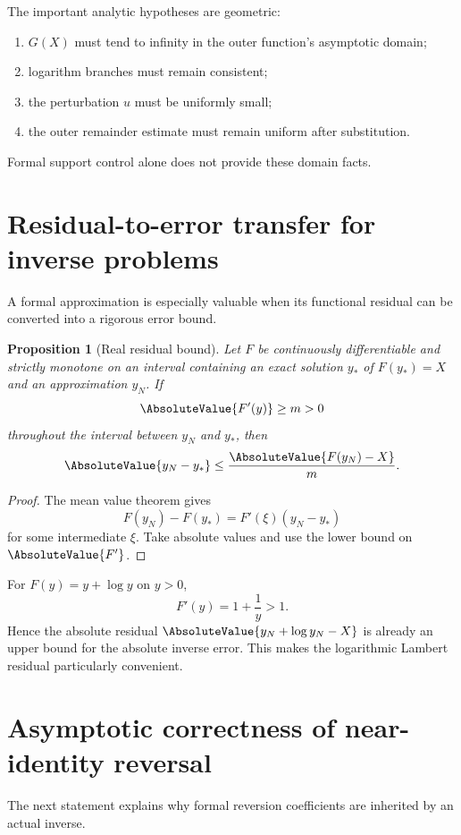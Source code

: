 \documentclass[11pt,openany]{book}
\theoremstyle{definition}
\theoremstyle{plain}
\newtheorem{proposition}{Proposition}[chapter]
\theoremstyle{remark}
\begin{document}
The important analytic hypotheses are geometric:
\begin{enumerate}
\item \(G(X)\) must tend to infinity in the outer function's asymptotic
      domain;
\item logarithm branches must remain consistent;
\item the perturbation \(u\) must be uniformly small;
\item the outer remainder estimate must remain uniform after substitution.
\end{enumerate}
Formal support control alone does not provide these domain facts.

\section{Residual-to-error transfer for inverse problems}
A formal approximation is especially valuable when its functional residual can
be converted into a rigorous error bound.

\begin{proposition}[Real residual bound]\label{prop:residual-error}
Let \(F\) be continuously differentiable and strictly monotone on an interval
containing an exact solution \(y_*\) of \(F(y_*)=X\) and an approximation
\(y_N\).  If
\[
 \AbsoluteValue{F'(y)}\ge m>0
\]
throughout the interval between \(y_N\) and \(y_*\), then
\begin{equation}\label{eq:residual-error-bound}
 \AbsoluteValue{y_N-y_*}\le\frac{\AbsoluteValue{F(y_N)-X}}{m}.
\end{equation}
\end{proposition}
\begin{proof}
The mean value theorem gives
\[
 F(y_N)-F(y_*)=F'(\xi)(y_N-y_*)
\]
for some intermediate \(\xi\).  Take absolute values and use the lower bound on
\(\AbsoluteValue{F'}\).
\end{proof}

For \(F(y)=y+\log y\) on \(y>0\),
\[
 F'(y)=1+\frac1y>1.
\]
Hence the absolute residual \(\AbsoluteValue{y_N+\log y_N-X}\) is already an upper bound for
the absolute inverse error.  This makes the logarithmic Lambert residual
particularly convenient.

\section{Asymptotic correctness of near-identity reversal}
The next statement explains why formal reversion coefficients are inherited by
an actual inverse.
\end{document}
